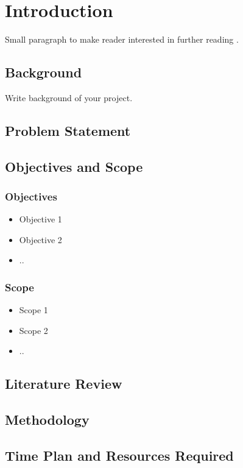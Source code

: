 \chapter{Introduction}%

Small paragraph to make reader interested in further reading \cite{Michel1993}. 

\section{Background}

Write background of your project.

\section{Problem Statement}

\section{Objectives and Scope}

\subsection{Objectives}
\begin{itemize}
	\item Objective 1
	\item Objective 2
	\item ..
\end{itemize}

\subsection{Scope}
\begin{itemize}
	\item Scope 1
	\item Scope 2
	\item ..
\end{itemize}

\section{Literature Review}

\section{Methodology}


\section{Time Plan and Resources Required}



